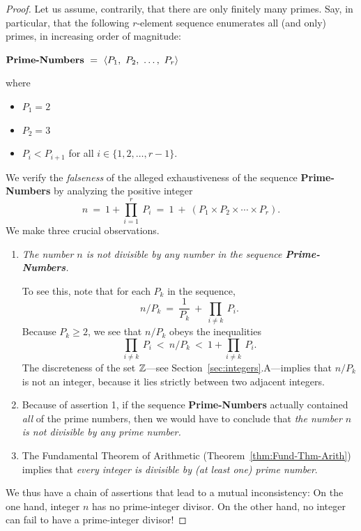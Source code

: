 \begin{proof}
Let us assume, contrarily, that there are only finitely many primes.  Say, in particular, that the following $r$-element sequence enumerates all (and only) primes, in increasing order of magnitude:

\medskip

$\mbox{\bf Prime-Numbers} \ = \ 
\langle P_1, \ P_2, \ \ldots, \ P_r \rangle$

\noindent where
\begin{itemize}
\item
$P_1 = 2$
\item
$P_2 = 3$
\item
$P_i < P_{i+1}$ for all $i \in \{1, 2, \ldots, r-1\}$.
\end{itemize}

\medskip

We verify the {\em falseness} of the alleged exhaustiveness of the sequence {\bf Prime-Numbers} by analyzing the positive integer
\[ n \ = \ 1 + \prod_{i=1}^r \ P_i \ = \ 1 \ + \ 
\left(P_1 \times P_2 \times \cdots \times P_r \right).
\]
We make three crucial observations.
\begin{enumerate}
\item
{\em The number $n$ is not divisible by any number in the sequence {\bf Prime-Numbers}.}

\smallskip

To see this, note that for each $P_k$ in the sequence,
\[
n / P_k \ = \ \frac{1}{P_k} \ + \ \prod_{i \neq k} \ P_i .
\]
Because $P_k \geq 2$, we see that $n / P_k$ obeys the inequalities
\[
\prod_{i \neq k} \ P_i \ < \ n/P_k \ < \ 1 + \prod_{i \neq k} \ P_i.
\] 
The discreteness of the set $\mathbb{Z}$---see Section~\ref{sec:integers}.A---implies that $n / P_k$ is not an integer, because it lies strictly between two adjacent integers.

\item
Because of assertion 1, if the sequence {\bf Prime-Numbers} actually contained {\em all} of the prime numbers, then we would have to conclude that {\em the number $n$ is not divisible by any prime number.}

\item
The Fundamental Theorem of Arithmetic (Theorem~\ref{thm:Fund-Thm-Arith}) implies that {\em every integer is divisible by (at least one) prime number}.
\end{enumerate}

We thus have a chain of assertions that lead to a mutual inconsistency: On the one hand, integer $n$ has no prime-integer divisor.  On the other hand, no integer can fail to have a prime-integer divisor!


\end{proof}
